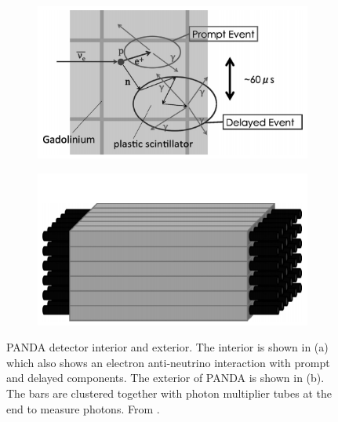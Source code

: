 \begin{figure}[!h]
\centering
\begin{subfigure}{.5\textwidth}
  \centering
\includegraphics[width=\linewidth]{Chapter2/Figs/Raster/Panda_close.png}
  \captionsetup{width=.9\linewidth}
  \caption{}
  \label{subFig:pandaClose}
\end{subfigure}%
\begin{subfigure}{.5\textwidth}
  \centering
  \includegraphics[width=\linewidth]{Chapter2/Figs/Raster/Panda_far.png}
  \captionsetup{width=.9\linewidth}
  \caption{}
  \label{subFig:pandaFar}
\end{subfigure}
\caption{PANDA detector interior and exterior. The interior is shown in (a) which also shows an electron anti-neutrino interaction with prompt and delayed components. The exterior of PANDA is shown in (b). The bars are clustered together with photon multiplier tubes at the end to measure photons. From \cite{PANDA_2014}.}
\label{fig:pandaCloseFar}
\end{figure}

